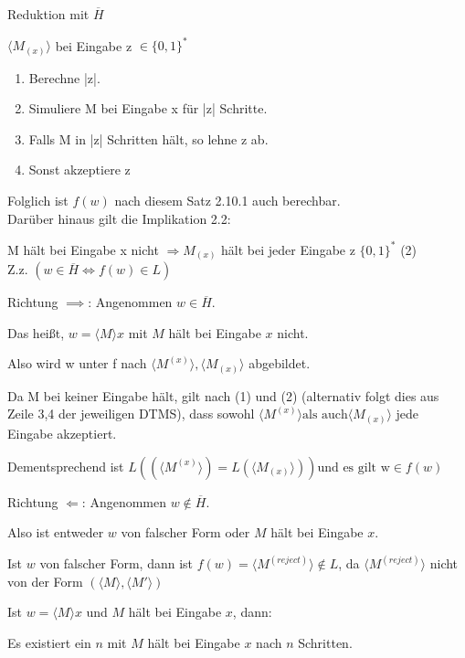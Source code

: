 \documentclass[answers]{submit}
\begin{document}
\begin{exercise}[6]{Reduktion mit $\overline{H}$}
{    $\langle M_{(x)}\rangle$ bei Eingabe z $\in \{0,1\}^*$
    \begin{enumerate}
      \item Berechne |z|.
      \item Simuliere M bei Eingabe x für |z| Schritte.
      \item Falls M in |z| Schritten hält, so lehne z ab.
      \item Sonst akzeptiere z
    \end{enumerate}
    Folglich ist $f(w)$ nach diesem Satz 2.10.1 auch berechbar. \\
    Darüber hinaus gilt die Implikation 2.2:

    M hält bei Eingabe x nicht $\Rightarrow M_{(x)}$ hält bei jeder Eingabe z $\{0,1\}^*$ (2) \\

    Z.z. $(w \in \overline{H} \iff f(w) \in L)$ \\

    \setlength{\parskip}{1em}

    Richtung $\implies$: Angenommen $w \in \overline{H}$.

    Das heißt, $w=\langle M\rangle x$ mit $M$ hält bei Eingabe $x$ nicht.

    Also wird w unter f nach $\langle M^{(x)}\rangle,\langle M_{(x)}\rangle$ abgebildet.

    Da M bei keiner Eingabe hält, gilt nach (1) und (2) (alternativ folgt dies aus Zeile 3,4 der jeweiligen DTMS), dass sowohl $\langle M^{(x)}\rangle \text{als auch}\langle M_{(x)}\rangle$ jede Eingabe akzeptiert.

    Dementsprechend ist $L((\langle M^{(x)}\rangle)= L(\langle M_{(x)}\rangle)) \text{und es gilt w}\in f(w)$

    \vspace{1cm}

    Richtung $\Leftarrow$: Angenommen $w \notin \overline{H}$.

    Also ist entweder $w$ von falscher Form oder $M$ hält bei Eingabe $x$.

    Ist $w$ von falscher Form, dann ist $f(w)=\langle M^{(reject)} \rangle \notin L$, da $\langle M^{(reject)} \rangle$ nicht von der Form $(\langle M \rangle, \langle M' \rangle)$

    Ist $w=\langle M\rangle x$ und $M$ hält bei Eingabe $x$, dann:

    Es existiert ein $n$ mit $M$ hält bei Eingabe $x$ nach $n$ Schritten.

}
\end{exercise}
\end{document}
